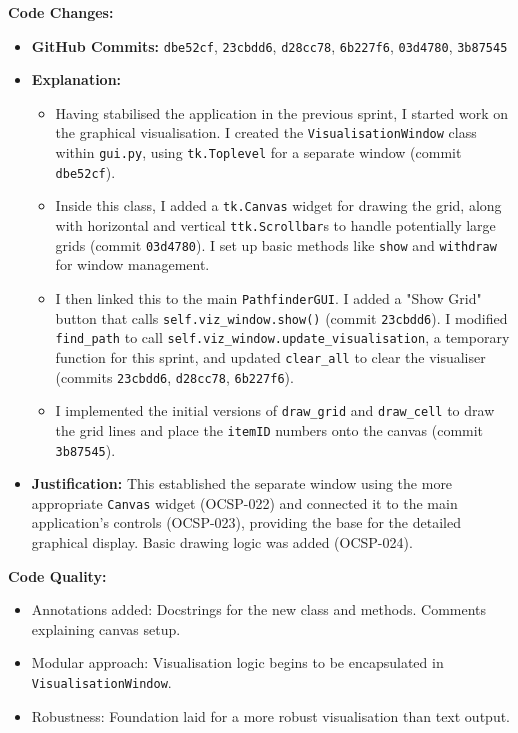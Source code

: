 \textbf{Code Changes:}
\begin{itemize}
	\item \textbf{GitHub Commits:} \verb|dbe52cf|, \verb|23cbdd6|, \verb|d28cc78|, \verb|6b227f6|, \verb|03d4780|, \verb|3b87545|
	\item \textbf{Explanation:}
	\begin{itemize}
		\item Having stabilised the application in the previous sprint, I started work on the graphical visualisation. I created the \verb|VisualisationWindow| class within \verb|gui.py|, using \verb|tk.Toplevel| for a separate window (commit \verb|dbe52cf|).
		\item Inside this class, I added a \verb|tk.Canvas| widget for drawing the grid, along with horizontal and vertical \verb|ttk.Scrollbar|s to handle potentially large grids (commit \verb|03d4780|). I set up basic methods like \verb|show| and \verb|withdraw| for window management.
		\item I then linked this to the main \verb|PathfinderGUI|. I added a "Show Grid" button that calls \verb|self.viz_window.show()| (commit \verb|23cbdd6|). I modified \verb|find_path| to call \verb|self.viz_window.update_visualisation|, a temporary function for this sprint, and updated \verb|clear_all| to clear the visualiser (commits \verb|23cbdd6|, \verb|d28cc78|, \verb|6b227f6|).
		\item I implemented the initial versions of \verb|draw_grid| and \verb|draw_cell| to draw the grid lines and place the \verb|itemID| numbers onto the canvas (commit \verb|3b87545|).
	\end{itemize}
	\item \textbf{Justification:} This established the separate window using the more appropriate \verb|Canvas| widget (OCSP-022) and connected it to the main application's controls (OCSP-023), providing the base for the detailed graphical display. Basic drawing logic was added (OCSP-024).
\end{itemize}

\textbf{Code Quality:}
\begin{itemize}
	\item Annotations added: Docstrings for the new class and methods. Comments explaining canvas setup.
	\item Modular approach: Visualisation logic begins to be encapsulated in \verb|VisualisationWindow|.
	\item Robustness: Foundation laid for a more robust visualisation than text output.
\end{itemize}

